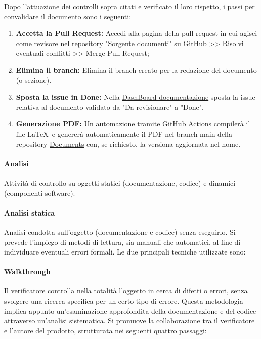 Dopo l'attuazione dei controlli sopra citati e verificato il loro rispetto, i passi per convalidare il documento sono i seguenti:
\begin{enumerate}
    \item \textbf{Accetta la Pull Request:} Accedi alla pagina della pull request in cui agisci come revisore nel repository "Sorgente documenti" su GitHub >> Risolvi eventuali conflitti >> Merge Pull Request;
    \item \textbf{Elimina il branch: } Elimina il branch creato per la redazione del documento (o sezione).
    \item \textbf{Sposta la issue in Done:} Nella \href{https://github.com/orgs/ByteOps-swe/projects/1/views/1}{DashBoard documentazione} sposta la issue relativa al documento validato da "Da revisionare" a "Done".
    \item \textbf{Generazione PDF:} Un automazione tramite GitHub Actions compilerà il file   \LaTeX\ e genererà automaticamente il PDF nel branch main della repository \href{https://github.com/ByteOps-swe/Documents}{Documents} con, se richiesto, la versiona aggiornata nel nome.
\end{enumerate}

\paragraph{Analisi}
Attività di controllo su oggetti statici (documentazione, codice) e dinamici (componenti
software).

\paragraph*{Analisi statica}

Analisi condotta sull'oggetto (documentazione e codice) senza eseguirlo. Si prevede l'impiego di metodi di lettura, sia manuali che automatici, al fine di individuare eventuali errori formali. Le due principali tecniche utilizzate sono:
\paragraph*{Walkthrough}
Il verificatore controlla nella totalità l’oggetto in cerca di difetti o errori, senza
svolgere una ricerca specifica per un certo tipo di errore.
Questa metodologia implica appunto un'esaminazione approfondita della documentazione e del codice attraverso un'analisi sistematica. Si promuove la collaborazione tra il verificatore e l'autore del prodotto, strutturata nei seguenti quattro passaggi:


